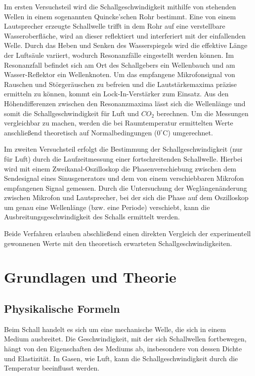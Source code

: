 \documentclass[12pt,a4paper,titlepage]{scrartcl}
\numberwithin{equation}{section}
\numberwithin{table}{section}
\numberwithin{figure}{section}
\begin{document}
Im ersten Versuchsteil wird die Schallgeschwindigkeit mithilfe von stehenden Wellen in einem sogenannten Quincke'schen Rohr bestimmt. Eine von einem Lautsprecher erzeugte Schallwelle trifft in dem Rohr auf eine verstellbare Wasseroberfläche, wird an dieser reflektiert und interferiert mit der einfallenden Welle. Durch das Heben und Senken des Wasserspiegels wird die effektive Länge der Luftsäule variiert, wodurch Resonanzfälle eingestellt werden können. Im Resonanzfall befindet sich am Ort des Schallgebers ein Wellenbauch und am Wasser-Reflektor ein Wellenknoten. Um das empfangene Mikrofonsignal von Rauschen und Störgeräuschen zu befreien und die Lautstärkemaxima präzise ermitteln zu können, kommt ein Lock-In-Verstärker zum Einsatz. Aus den Höhendifferenzen zwischen den Resonanzmaxima lässt sich die Wellenlänge und somit die Schallgeschwindigkeit für Luft und $CO_2$ berechnen. Um die Messungen vergleichbar zu machen, werden die bei Raumtemperatur ermittelten Werte anschließend theoretisch auf Normalbedingungen ($0^{\circ}\text{C}$) umgerechnet.

Im zweiten Versuchsteil erfolgt die Bestimmung der Schallgeschwindigkeit (nur für Luft) durch die Laufzeitmessung einer fortschreitenden Schallwelle. Hierbei wird mit einem Zweikanal-Oszilloskop die Phasenverschiebung zwischen dem Sendesignal eines Sinusgenerators und dem von einem verschiebbaren Mikrofon empfangenen Signal gemessen. Durch die Untersuchung der Weglängenänderung zwischen Mikrofon und Lautsprecher, bei der sich die Phase auf dem Oszilloskop um genau eine Wellenlänge (bzw. eine Periode) verschiebt, kann die Ausbreitungsgeschwindigkeit des Schalls ermittelt werden.

Beide Verfahren erlauben abschließend einen direkten Vergleich der experimentell gewonnenen Werte mit den theoretisch erwarteten Schallgeschwindigkeiten.

\section{Grundlagen und Theorie}\label{Grundlagen}
\subsection{Physikalische Formeln}
Beim Schall handelt es sich um eine mechanische Welle, die sich in einem Medium ausbreitet. Die Geschwindigkeit, mit der sich Schallwellen fortbewegen, hängt von den Eigenschaften des Mediums ab, insbesondere von dessen Dichte und Elastizität. In Gasen, wie Luft, kann die Schallgeschwindigkeit durch die Temperatur beeinflusst werden.
\end{document}

